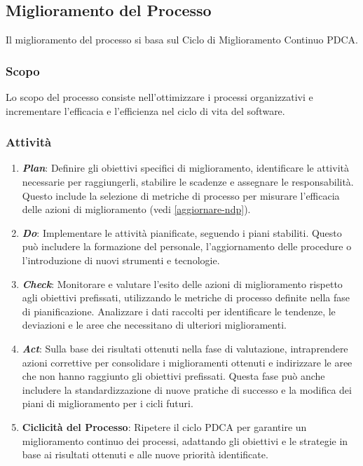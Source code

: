 \subsection{Miglioramento del Processo}

Il miglioramento del processo si basa sul Ciclo di Miglioramento Continuo PDCA.

\subsubsection{Scopo}
Lo scopo del processo consiste nell'ottimizzare i processi organizzativi e
incrementare l'efficacia e l'efficienza nel ciclo di vita del software.

\subsubsection{Attività}
\begin{enumerate}
	\item \textbf{\textit{Plan}}:
	      Definire gli obiettivi specifici di miglioramento, identificare le
	      attività necessarie per raggiungerli, stabilire le scadenze e
	      assegnare le responsabilità. Questo include la selezione di metriche
	      di processo per misurare l'efficacia delle azioni di miglioramento
	      (vedi \autoref{aggiornare-ndp}).

	\item \textbf{\textit{Do}}:
	      Implementare le attività pianificate, seguendo i piani stabiliti.
	      Questo può includere la formazione del personale, l'aggiornamento
	      delle procedure o l'introduzione di nuovi strumenti e tecnologie.

	\item \textbf{\textit{Check}}:
	      Monitorare e valutare l'esito delle azioni di miglioramento rispetto
	      agli obiettivi prefissati, utilizzando le metriche di processo
	      definite nella fase di pianificazione. Analizzare i dati raccolti per
	      identificare le tendenze, le deviazioni e le aree che necessitano di
	      ulteriori miglioramenti.
	\item \textbf{\textit{Act}}:
	      Sulla base dei risultati ottenuti nella fase di valutazione,
	      intraprendere azioni correttive per consolidare i miglioramenti
	      ottenuti e indirizzare le aree che non hanno raggiunto gli obiettivi
	      prefissati. Questa fase può anche includere la standardizzazione di
	      nuove pratiche di successo e la modifica dei piani di miglioramento
	      per i cicli futuri.

	\item \textbf{Ciclicità del Processo}:
	      Ripetere il ciclo PDCA per garantire un miglioramento continuo dei
	      processi, adattando gli obiettivi e le strategie in base ai risultati
	      ottenuti e alle nuove priorità identificate.
\end{enumerate}
